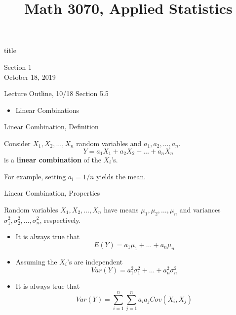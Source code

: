 \documentclass[t,handout]{beamer}
\title{Math 3070, Applied Statistics}
\newcommand{\nl}[1]{\vspace{#1 em}}
\begin{document}
\begin{frame}[c]
    \begin{beamercolorbox}[rounded=true,wd=\textwidth,center]{title}
        \inserttitle
    \end{beamercolorbox}
    \begin{center}
        Section 1\\
        \nl{0.5}
        October 18, 2019
    \end{center}
\end{frame}
\begin{frame}[c]{Lecture Outline, 10/18}
    Section 5.5
    \begin{itemize}
        \item Linear Combinations
    \end{itemize}
\end{frame}
\begin{frame}[c]{Linear Combination, Definition}
    \begin{block}{}
        Consider $X_1,X_2, \ldots, X_n$ random variables and $a_1,a_2,\ldots, a_n$.
        $$Y = a_1 X_1+ a_2 X_2 + \ldots + a_n X_n$$
        is a \textbf{linear combination} of the $X_i$'s.
    \end{block}
    For example, setting $a_i =1/n$ yields the mean.
\end{frame}
\begin{frame}[c]{Linear Combination, Properties}
    \begin{block}{}
        Random variables $X_1,X_2, \ldots, X_n$ have means $\mu_1,\mu_2,\ldots, \mu_n$ and variances $\sigma^2_1,\sigma^2_2,\ldots,\sigma^2_n$, respectively.
        \begin{itemize}
            \item It is always true that 
            $$E(Y) = a_1 \mu_1 + \ldots + a_n \mu_n$$
            \item Assuming the $X_i$'s are independent
            $$Var(Y) = a_1^2 \sigma^2_1 + \ldots + a_n^2 \sigma^2_n$$
            \item It is always true that 
            $$ Var(Y) = \sum_{i=1}^n \sum_{j=1}^n a_i a_j Cov(X_i,X_j) $$
        \end{itemize}
    \end{block}
\end{frame}
\end{document}
